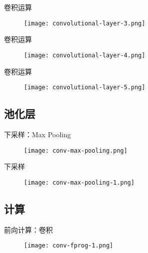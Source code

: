 \begin{frame}[fragile]{卷积运算}
  \begin{figure}
    \centering
    \texttt{[image: convolutional-layer-3.png]}
  \end{figure}
\end{frame}

\begin{frame}[fragile]{卷积运算}
  \begin{figure}
    \centering
    \texttt{[image: convolutional-layer-4.png]}
  \end{figure}
\end{frame}

\begin{frame}[fragile]{卷积运算}
  \begin{figure}
    \centering
    \texttt{[image: convolutional-layer-5.png]}
  \end{figure}
\end{frame}

\subsection{池化层}

\begin{frame}[fragile]{下采样：Max Pooling}
  \begin{figure}
    \centering
    \texttt{[image: conv-max-pooling.png]}
  \end{figure}
\end{frame}

\begin{frame}[fragile]{下采样}
  \begin{figure}
    \centering
    \texttt{[image: conv-max-pooling-1.png]}
  \end{figure}
\end{frame}

\subsection{计算}

\begin{frame}[fragile]{前向计算：卷积}
  \begin{figure}
    \centering
    \texttt{[image: conv-fprog-1.png]}
  \end{figure}
\end{frame}

